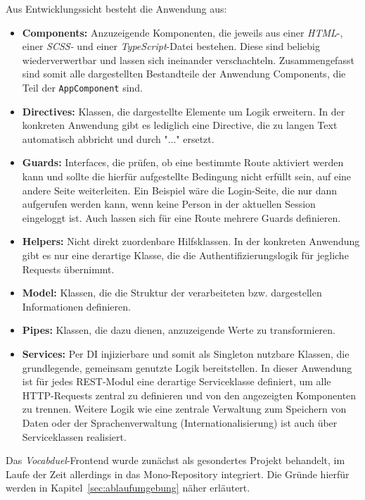 Aus Entwicklungssicht besteht die Anwendung aus:

\begin{itemize}
    \item \textbf{Components:} Anzuzeigende Komponenten, die jeweils aus einer \textit{HTML}-, einer \textit{SCSS-}
    und einer \textit{TypeScript}-Datei bestehen. Diese sind beliebig wiederverwertbar und lassen sich ineinander verschachteln.
    Zusammengefasst sind somit alle dargestellten Bestandteile der Anwendung Components, die Teil der \texttt{AppComponent} sind.
    \item \textbf{Directives:} Klassen, die dargestellte Elemente um Logik erweitern. In der konkreten Anwendung gibt es lediglich
    eine Directive, die zu langen Text automatisch abbricht und durch "..." ersetzt.
    \item \textbf{Guards:} Interfaces, die prüfen, ob eine bestimmte Route aktiviert werden kann und sollte die hierfür
    aufgestellte Bedingung nicht erfüllt sein, auf eine andere Seite weiterleiten. Ein Beispiel wäre die Login-Seite, die nur
    dann aufgerufen werden kann, wenn keine Person in der aktuellen Session eingeloggt ist. Auch lassen sich für eine Route mehrere
    Guards definieren.
    \item \textbf{Helpers:} Nicht direkt zuordenbare Hilfsklassen. In der konkreten Anwendung gibt es nur eine derartige
    Klasse, die die Authentifizierungslogik für jegliche Requests übernimmt.
    \item \textbf{Model:} Klassen, die die Struktur der verarbeiteten bzw. dargestellen Informationen definieren.
    \item \textbf{Pipes:} Klassen, die dazu dienen, anzuzeigende Werte zu transformieren.
    \item \textbf{Services:} Per DI injizierbare und somit als Singleton nutzbare Klassen, die grundlegende, gemeinsam genutzte
    Logik bereitstellen. In dieser Anwendung ist für jedes REST-Modul eine derartige Serviceklasse definiert, um alle HTTP-Requests
    zentral zu definieren und von den angezeigten Komponenten zu trennen. Weitere Logik wie eine zentrale Verwaltung zum Speichern
    von Daten oder der Sprachenverwaltung (Internationalisierung) ist auch über Serviceklassen realisiert.
\end{itemize}

Das \textit{Vocabduel}-Frontend wurde zunächst als gesondertes Projekt behandelt, im Laufe der Zeit allerdings in das Mono-Repository integriert.
Die Gründe hierfür werden in Kapitel~\ref{sec:ablaufumgebung} näher erläutert.

